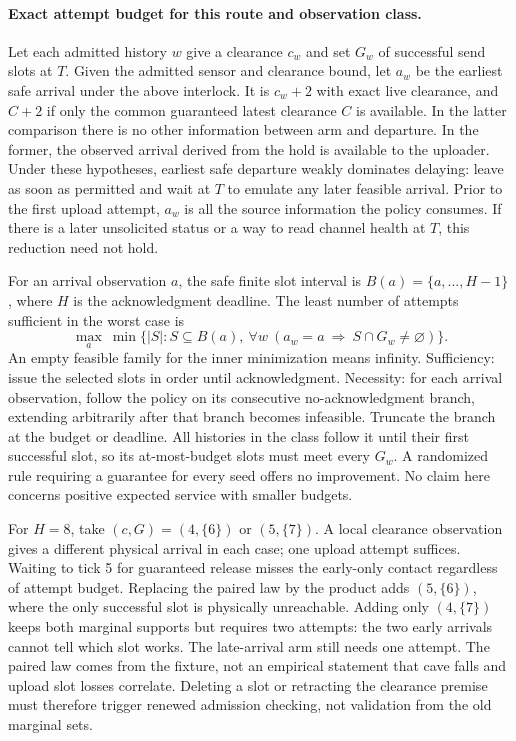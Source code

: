 \documentclass[11pt]{article}
\begin{document}
\paragraph{Exact attempt budget for this route and observation class.}
Let each admitted history \(w\) give a clearance \(c_w\) and set \(G_w\)
of successful send slots at \(T\). Given the admitted sensor and clearance
bound, let \(a_w\) be the earliest safe arrival under the above interlock.
It is \(c_w+2\) with exact live clearance, and \(C+2\) if only the common
guaranteed latest clearance \(C\) is available. In the latter comparison
there is no other information between arm and departure. In the former,
the observed arrival derived from the hold is available to the uploader.
Under these hypotheses, earliest safe departure weakly dominates delaying:
leave as soon as permitted and wait at \(T\) to emulate any later feasible
arrival. Prior to the first upload attempt, \(a_w\) is all the source
information the policy consumes. If there is a later unsolicited status
or a way to read channel health at \(T\), this reduction need not hold.

For an arrival observation \(a\), the safe finite slot interval is
\(B(a)=\{a,\ldots,H-1\}\), where \(H\) is the acknowledgment deadline.
The least number of attempts sufficient in the worst case is
\[
 \max_{a}\ \min\{|S|:S\subseteq B(a),\
       \forall w\ (a_w=a\ \Longrightarrow\ S\cap G_w\ne\varnothing)\}.
\]
An empty feasible family for the inner minimization means infinity.
Sufficiency: issue the selected slots in order until acknowledgment.
Necessity: for each arrival observation, follow the policy on its
consecutive no-acknowledgment branch, extending arbitrarily after that
branch becomes infeasible. Truncate the branch at the budget or deadline.
All histories in the class follow it until their first successful slot,
so its at-most-budget slots must meet every \(G_w\). A randomized rule
requiring a guarantee for every seed offers no improvement. No claim
here concerns positive expected service with smaller budgets.

For \(H=8\), take \((c,G)=(4,\{6\})\) or \((5,\{7\})\). A local clearance
observation gives a different physical arrival in each case; one upload
attempt suffices. Waiting to tick 5 for guaranteed release misses the
early-only contact regardless of attempt budget. Replacing the paired
law by the product adds \((5,\{6\})\), where the only successful slot is
physically unreachable. Adding only \((4,\{7\})\) keeps both marginal
supports but requires two attempts: the two early arrivals cannot tell
which slot works. The late-arrival arm still needs one attempt. The paired
law comes from the fixture, not an empirical statement that cave falls
and upload slot losses correlate. Deleting a slot or retracting the
clearance premise must therefore trigger renewed admission checking,
not validation from the old marginal sets.
\end{document}
